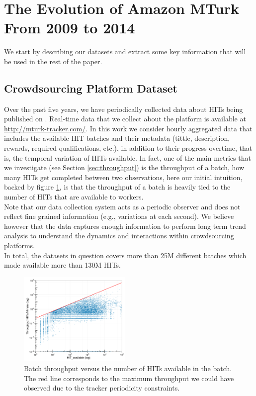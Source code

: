 \section{The Evolution of Amazon MTurk\\ From 2009 to 2014}
\label{sec:stats}

We start by describing our datasets and extract some key information that will be used in the rest of the paper.

\subsection{Crowdsourcing Platform Dataset}
\label{sec:tracker}
Over the past five years, we have periodically collected data about HITs being published on \amt{}.
Real-time data that we collect about the platform is available at \url{http://mturk-tracker.com/}. In this work we consider hourly aggregated data that includes the available HIT batches and their metadata (tittle, description, rewards, required qualifications, etc.), in addition to their progress overtime, that is, the temporal variation of HITs available. In fact, one of the main metrics that we investigate (see Section \ref{sec:throughput}) is the throughput of a batch, how many HITs  get completed between two observations, here our initial intuition, backed by figure \ref{fig:motiv}, is that the throughput of a batch is heavily tied to the number of HITs that are available to workers.\\
Note that our data collection system acts  as a periodic observer and does not reflect fine grained information (e.g., variations at each second). We believe however that the data captures enough information to perform long term trend analysis to understand the dynamics and interactions within crowdsourcing platforms.\\

In total, the datasets in question covers more than 25M different batches which made available more than 130M HITs.

\begin{figure}[tb]
	\centering
		\includegraphics[width=0.48\textwidth]{figures/motiv_mturk}
	\caption{Batch throughput versus the number of HITs available in the batch. The red line corresponds to the maximum throughput we could have observed due to the tracker periodicity constraints.\protect\footnotemark}
	\label{fig:motiv}
\end{figure}

